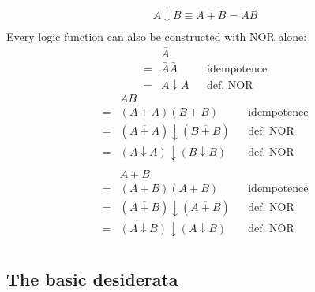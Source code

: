 \documentclass[9pt, letterpaper]{article}
\begin{document}
\begin{itemize}
\begin{item}
        \begin{align*}
            A \downarrow B \equiv \overline{A + B} = \bar{A} \bar{B} \\
        \end{align*}
        Every logic function can also be constructed with NOR alone:
        \begin{align*}
            & \overline{A} \\
            = &\bar{A} \bar{A} && \text{idempotence} \\
            = &A \downarrow A && \text{def. NOR}
        \end{align*}
        \begin{align*}
            & AB \\
            = &\left(A+A\right)\left(B+B\right) && \text{idempotence} \\
            = &\left(\overline{A+A} \right) \downarrow \left(\overline{B+B} \right) && \text{def. NOR}\\
            = &\left(A \downarrow A\right) \downarrow \left(B \downarrow B\right) && \text{def. NOR}\\
        \end{align*}
        \begin{align*}
            &A+B \\
            =&\left(A+B \right) \left(A+B \right) && \text{idempotence} \\
            =&\left(\overline{A+B} \right) \downarrow \left(\overline{A+B} \right) && \text{def. NOR} \\
            =&\left(A \downarrow B\right) \downarrow \left(A \downarrow B\right) && \text{def. NOR} \\
        \end{align*}
    \end{item}
\end{itemize}

\subsection{The basic desiderata}
\end{document}
